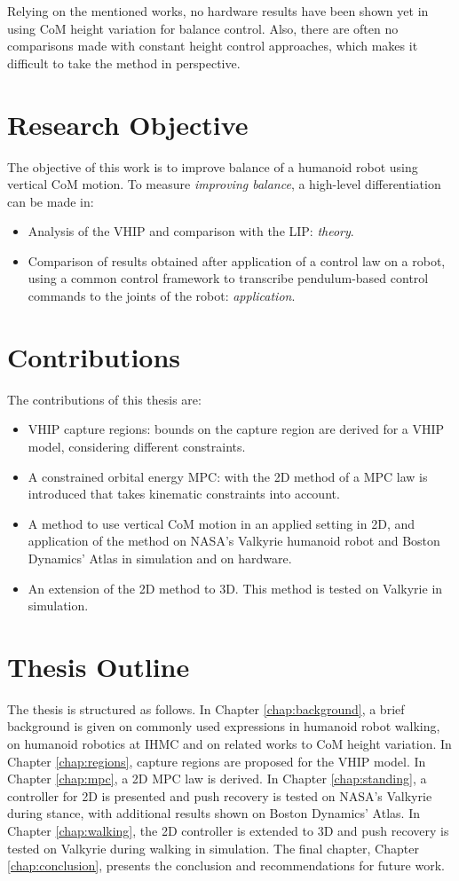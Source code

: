 Relying on the mentioned works, no hardware results have been shown yet in using \ac{CoM} height variation for balance control. Also, there are often no comparisons made with constant height control approaches, which makes it difficult to take the method in perspective.

\section{Research Objective}
The objective of this work is to improve balance of a humanoid robot using vertical \ac{CoM} motion. To measure \textit{improving balance}, a high-level differentiation can be made in:
\begin{itemize}
	\item Analysis of the \ac{VHIP} and comparison with the \ac{LIP}: \textit{theory}.
	\item Comparison of results obtained after application of a control law on a robot, using a common control framework to transcribe pendulum-based control commands to the joints of the robot: \textit{application}.
\end{itemize}

\section{Contributions}
The contributions of this thesis are:
\begin{itemize}
	\item \ac{VHIP} capture regions: bounds on  the capture region are derived for a \ac{VHIP} model, considering different constraints.
      \item A constrained orbital energy \ac{MPC}: with the \ac{2D} method of \cite{koolen2016balance} a \ac{MPC} law is introduced that takes kinematic constraints into account.
	\item A method to use vertical \ac{CoM} motion in an applied setting in \ac{2D}, and application of the method on NASA's Valkyrie humanoid robot and Boston Dynamics' Atlas in simulation and on hardware.
	\item An extension of the \ac{2D} method to \ac{3D}. This method is tested on Valkyrie in simulation.
\end{itemize}
\section{Thesis Outline}
The thesis is structured as follows. In Chapter \ref{chap:background}, a brief background is given on commonly used expressions in humanoid robot walking, on humanoid robotics at \ac{IHMC} and on related works to \ac{CoM} height variation. In Chapter \ref{chap:regions}, capture regions are proposed for the \ac{VHIP} model. In Chapter \ref{chap:mpc}, a \ac{2D} \ac{MPC} law is derived. In Chapter \ref{chap:standing}, a controller for \ac{2D} is presented and push recovery is tested on NASA's Valkyrie during stance, with additional results shown on Boston Dynamics' Atlas. In Chapter \ref{chap:walking}, the \ac{2D} controller is extended to \ac{3D} and push recovery is tested on Valkyrie during walking in simulation. The final chapter, Chapter \ref{chap:conclusion}, presents the conclusion and recommendations for future work.

